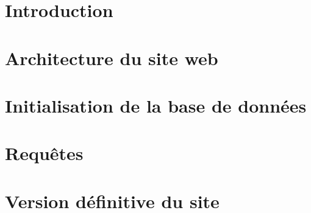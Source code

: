 \documentclass{article}
\begin{document}
\thispagestyle{empty}
\tableofcontents
\pagebreak
\setcounter{page}{1}

\section{Introduction}

\section{Architecture du site web}

\section{Initialisation de la base de données}

\section{Requêtes}

\section{Version définitive du site}

\end{document}
